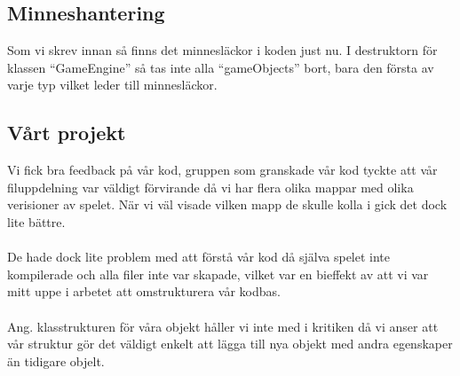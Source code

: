 \documentclass{TDP003mall}
\begin{document}
\subsection{Minneshantering}
Som vi skrev innan så finns det minnesläckor i koden just nu. I destruktorn för klassen ``GameEngine'' så tas inte alla ``gameObjects'' bort, bara den första av varje typ vilket leder till minnesläckor.

\subsection{Vårt projekt}
Vi fick bra feedback på vår kod, gruppen som granskade vår kod tyckte att vår filuppdelning var väldigt förvirande då vi har flera olika mappar med olika verisioner av spelet. När vi väl visade vilken mapp de skulle kolla i gick det dock lite bättre.
\\\\
De hade dock lite problem med att förstå vår kod då själva spelet inte kompilerade och alla filer inte var skapade, vilket var en bieffekt av att vi var mitt uppe i arbetet att omstrukturera vår kodbas.
\\\\
Ang. klasstrukturen för våra objekt håller vi inte med i kritiken då vi anser att vår struktur gör det väldigt enkelt att lägga till nya objekt med andra egenskaper än tidigare objelt.
\end{document}
